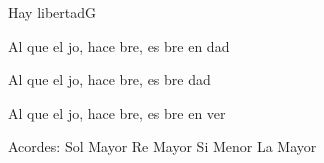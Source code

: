 \documentclass[12pt, spanish]{book}
\begin{document}
\begin{song}{Hay libertad}{G}
\begin{SBOpGroup}
            Al que el jo, hace bre, es bre en dad~

            Al que el jo, hace bre, es bre   dad~

            Al que el jo, hace bre, es bre en ver
        \end{SBOpGroup}

        \ifChordBk
        \begin{SBOpGroup}
            Acordes:
            \upchord{\G}\qquad Sol Mayor \hfill
            \upchord{\D}\qquad Re Mayor \hfill\null\break
            \upchord{\Bm}\qquad Si Menor \hfill
            \upchord{\A}\qquad La Mayor \hfill\null\break
        \end{SBOpGroup}
        \fi
    \end{song}
\end{document}
